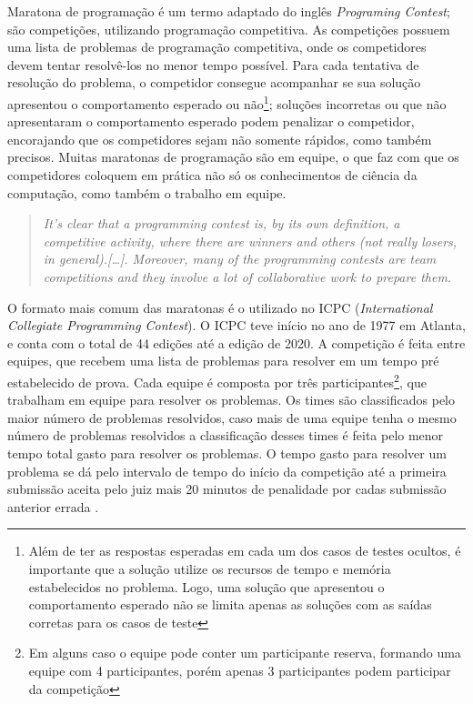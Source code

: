 Maratona de programação é um termo adaptado do inglês \textit{Programing Contest}; são competições, utilizando programação competitiva. As competições possuem uma lista de problemas de programação competitiva, onde os competidores devem tentar resolvê-los no menor tempo possível. Para cada tentativa de resolução do problema, o competidor consegue acompanhar se sua solução apresentou o comportamento esperado ou não\footnote{Além de ter as respostas esperadas em cada um dos casos de testes ocultos, é importante que a solução utilize os recursos de tempo e memória estabelecidos no problema. Logo, uma solução que apresentou o comportamento esperado não se limita apenas as soluções com as saídas corretas para os casos de teste}; soluções incorretas ou que não apresentaram o comportamento esperado podem penalizar o competidor, encorajando que os competidores sejam não somente rápidos, como também precisos. Muitas maratonas de programação são em equipe, o que faz com que os competidores coloquem em prática não só os conhecimentos de ciência da computação, como também o trabalho em equipe.

\begin{quote}
\textit{It’s clear that a programming contest is, by its own definition, a competitive activity, where there are winners and others (not really losers, in general).[\dots]. Moreover, many of the programming contests are team competitions and they involve a lot of collaborative work to prepare them.}
\cite[p.132]{revilla2008competitive}
\end{quote}

O formato mais comum das maratonas é o utilizado no ICPC (\textit{International Collegiate Programming Contest}). O ICPC teve início no ano de 1977 em Atlanta, e conta com o total de 44 edições até a edição de 2020. A competição é feita entre equipes, que recebem uma lista de problemas para resolver em um tempo pré estabelecido de prova. Cada equipe é composta por três participantes\footnote{Em alguns caso o equipe pode conter um participante reserva, formando uma equipe com 4 participantes, porém apenas 3 participantes podem participar da competição}, que trabalham em equipe para resolver os problemas. Os times são classificados pelo maior número de problemas resolvidos, caso mais de uma equipe tenha o mesmo número de problemas resolvidos a classificação desses times é feita pelo menor tempo total gasto para resolver os problemas. O tempo gasto para resolver um problema se dá pelo intervalo de tempo do início da competição até a primeira submissão aceita pelo juiz mais 20 minutos de penalidade por cadas submissão anterior errada \cite{aboutICPC}. 

